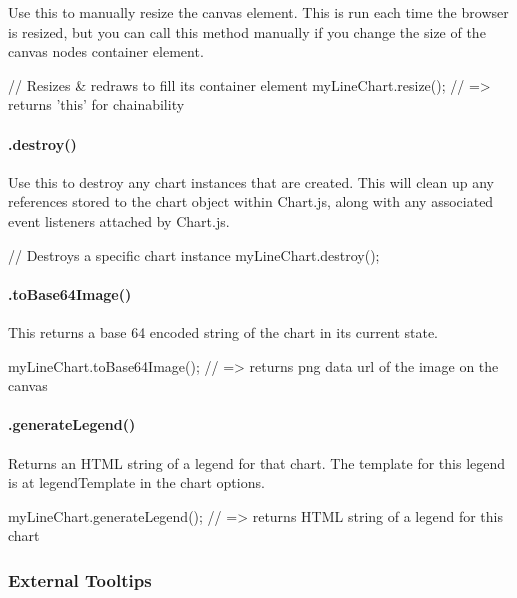 Use this to manually resize the canvas element. This is run each time the browser is resized, but you can call this method manually if you change the size of the canvas nodes container element.


\begin{DoxyCode}
// Resizes & redraws to fill its container element
myLineChart.resize();
// => returns 'this' for chainability
\end{DoxyCode}


\paragraph*{.destroy()}

Use this to destroy any chart instances that are created. This will clean up any references stored to the chart object within Chart.\+js, along with any associated event listeners attached by Chart.\+js.


\begin{DoxyCode}
// Destroys a specific chart instance
myLineChart.destroy();
\end{DoxyCode}


\paragraph*{.to\+Base64\+Image()}

This returns a base 64 encoded string of the chart in it\textquotesingle{}s current state.


\begin{DoxyCode}
myLineChart.toBase64Image();
// => returns png data url of the image on the canvas
\end{DoxyCode}


\paragraph*{.generate\+Legend()}

Returns an H\+T\+ML string of a legend for that chart. The template for this legend is at {\ttfamily legend\+Template} in the chart options.


\begin{DoxyCode}
myLineChart.generateLegend();
// => returns HTML string of a legend for this chart
\end{DoxyCode}


\subsubsection*{External Tooltips}


